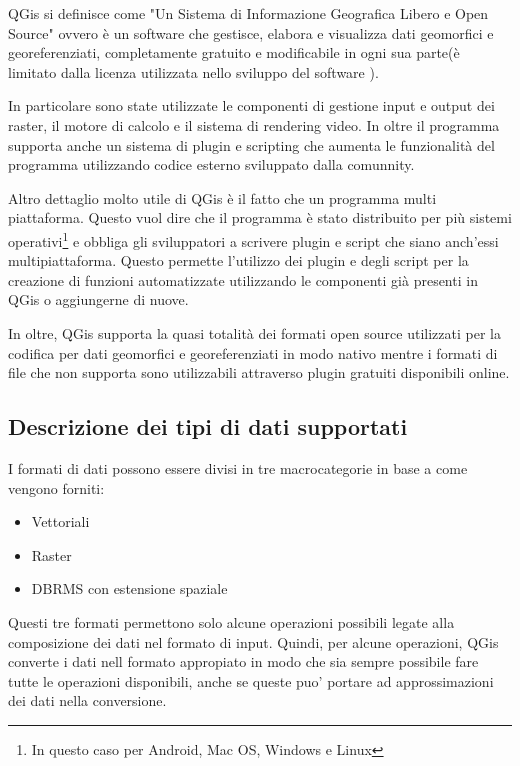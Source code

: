 QGis si definisce come "Un Sistema di Informazione Geografica Libero e Open Source"\cite{site:qgis} ovvero è un software che gestisce, elabora e visualizza dati geomorfici e georeferenziati, completamente gratuito e modificabile in ogni sua parte(è limitato dalla licenza utilizzata nello sviluppo del software \cite{site:cc3}).

In particolare sono state utilizzate le componenti di gestione input e output dei raster, il motore di calcolo e il sistema di rendering video. In oltre il programma supporta anche un sistema di plugin e scripting che aumenta le funzionalità del programma utilizzando codice esterno sviluppato dalla comunnity.

Altro dettaglio molto utile di QGis è il fatto che un programma multi piattaforma. Questo vuol dire che il programma è stato distribuito per più sistemi operativi\footnote{In questo caso per Android, Mac OS, Windows e Linux} e obbliga gli sviluppatori a scrivere plugin e script che siano anch'essi multipiattaforma. Questo permette l'utilizzo dei plugin e degli script per la creazione di funzioni automatizzate utilizzando le componenti già presenti in QGis o aggiungerne di nuove.

In oltre, QGis supporta la quasi totalità dei formati open source utilizzati per la codifica per dati geomorfici e georeferenziati in modo nativo mentre i formati di file che non supporta sono utilizzabili attraverso plugin gratuiti disponibili online.

\subsection{Descrizione dei tipi di dati supportati}

I formati di dati possono essere divisi in tre macrocategorie in base a come vengono forniti:
\begin{itemize}
	\item Vettoriali
	\item Raster
	\item DBRMS con estensione spaziale
\end{itemize}

Questi tre formati permettono solo alcune operazioni possibili legate alla composizione dei dati nel formato di input.
Quindi, per alcune operazioni, QGis converte i dati nell formato appropiato in modo che sia sempre possibile fare tutte le operazioni disponibili, anche se queste puo' portare ad approssimazioni dei dati nella conversione.

